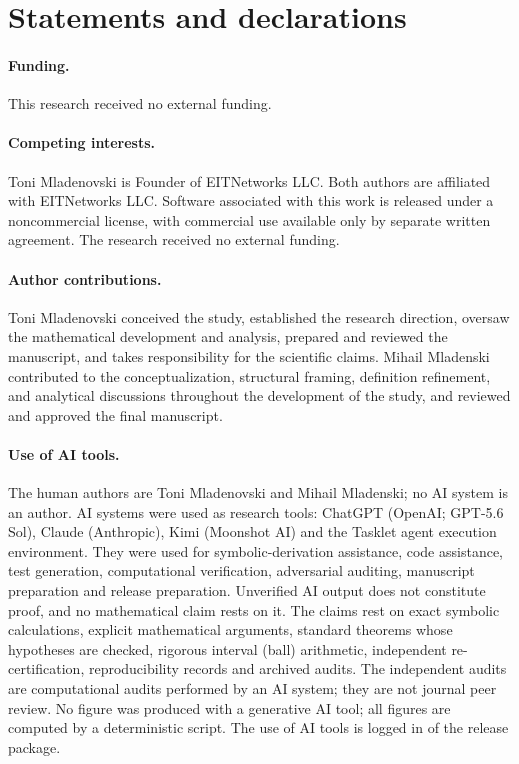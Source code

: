 \section*{Statements and declarations}\label{sec:declarations}

\paragraph{Funding.} This research received no external funding.

\paragraph{Competing interests.}
Toni Mladenovski is Founder of EITNetworks LLC. Both authors are affiliated with EITNetworks LLC. Software associated with this work is released under a noncommercial license, with commercial use
available only by separate written agreement. The research received no external funding.

\paragraph{Author contributions.}
Toni Mladenovski conceived the study, established the research direction, oversaw the mathematical development and
analysis, prepared and reviewed the manuscript, and takes responsibility for the scientific claims. Mihail Mladenski
contributed to the conceptualization, structural framing, definition refinement, and analytical discussions
throughout the development of the study, and reviewed and approved the final manuscript.

\paragraph{Use of AI tools.} The human authors are Toni Mladenovski and Mihail Mladenski; no AI system is an
author. AI systems were used as research tools: ChatGPT (OpenAI; GPT-5.6 Sol), Claude (Anthropic), Kimi (Moonshot AI)
and the Tasklet agent execution environment. They were used for symbolic-derivation assistance, code assistance, test
generation, computational verification, adversarial auditing, manuscript preparation and release preparation.
Unverified AI output does not constitute proof, and no mathematical claim rests on it. The claims rest on exact
symbolic calculations, explicit mathematical arguments, standard theorems whose hypotheses are checked, rigorous
interval (ball) arithmetic, independent re-certification, reproducibility records and archived audits. The independent
audits are computational audits performed by an AI system; they are not journal peer review. No figure was produced
with a generative AI tool; all figures are computed by a deterministic script. The use of AI tools is logged in
 of the release package.

